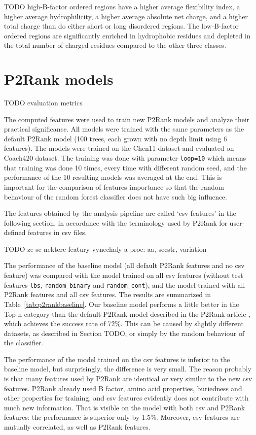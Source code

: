 TODO high-B-factor ordered regions
have a higher average flexibility index, a higher average
hydrophilicity, a higher average absolute net charge, and a
higher total charge than do either short or long disordered
regions. The low-B-factor ordered regions are significantly
enriched in hydrophobic residues and depleted in the total
number of charged residues compared to the other three
classes. 




\section{P2Rank models}

TODO evaluation metrics

The computed features were used to train new P2Rank models and analyze their practical significance. All models were trained with the same parameters as the default P2Rank model (100 trees, each grown with no depth limit using 6 features). The models were trained on the Chen11 dataset and evaluated on Coach420 dataset. The training was done with parameter \texttt{loop=10} which means that training was done 10 times, every time with different random seed, and the performance of the 10 resulting models was averaged at the end. This is important for the comparison of features importance so that the random behaviour of the random forest classifier does not have such big influence.

The features obtained by the analysis pipeline are called `csv features' in the following section, in accordance with the terminology used by P2Rank for user-defined features in csv files.

TODO ze se nektere featury vynechaly a proc: aa, secstr, variation

The performance of the baseline model (all default P2Rank features and no csv feature) was compared with the model trained on all csv features (without test features \texttt{lbs}, \texttt{random\_binary} and \texttt{random\_cont}), and the model trained with all P2Rank features and all csv features. The results are summarized in Table~\ref{tab:p2rankbaseline}. Our baseline model performs a little better in the Top-n category than the default P2Rank model described in the P2Rank article \cite{p2rank1}, which achieves the success rate of 72\%. This can be caused by  slightly different datasets, as described in Section TODO, or simply by the random behaviour of the classifier.

The performance of the model trained on the csv features is inferior to the baseline model, but surprisingly, the difference is very small. The reason probably is that many features used by P2Rank are identical or very similar to the new csv features. P2Rank already used B factor, amino acid properties, buriedness and other properties for training, and csv features evidently does not contribute with much new information. That is visible on the model with both csv and P2Rank features: the performance is superior only by 1.5\%. Moreover, csv features are mutually correlated, as well as P2Rank features. 

